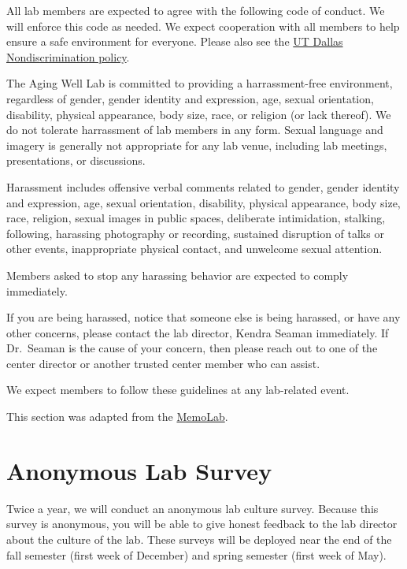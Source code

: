 \documentclass[]{book}
\begin{document}
All lab members are expected to agree with the following code of conduct. We will enforce this code as needed. We expect cooperation with all members to help ensure a safe environment for everyone. Please also see the \href{https://policy.utdallas.edu/utdbp3090}{UT Dallas Nondiscrimination policy}.

The Aging Well Lab is committed to providing a harrassment-free environment, regardless of gender, gender identity and expression, age, sexual orientation, disability, physical appearance, body size, race, or religion (or lack thereof). We do not tolerate harrassment of lab members in any form. Sexual language and imagery is generally not appropriate for any lab venue, including lab meetings, presentations, or discussions.

Harassment includes offensive verbal comments related to gender, gender identity and expression, age, sexual orientation, disability, physical appearance, body size, race, religion, sexual images in public spaces, deliberate intimidation, stalking, following, harassing photography or recording, sustained disruption of talks or other events, inappropriate physical contact, and unwelcome sexual attention.

Members asked to stop any harassing behavior are expected to comply immediately.

If you are being harassed, notice that someone else is being harassed, or have any other concerns, please contact the lab director, Kendra Seaman immediately. If Dr.~Seaman is the cause of your concern, then please reach out to one of the center director or another trusted center member who can assist.

We expect members to follow these guidelines at any lab-related event.

This section was adapted from the \href{https://github.com/memobc/memolab-manual\#code-of-conduct}{MemoLab}.

\hypertarget{anonymous-lab-survey}{%
\section{Anonymous Lab Survey}\label{anonymous-lab-survey}}

Twice a year, we will conduct an anonymous lab culture survey. Because this survey is anonymous, you will be able to give honest feedback to the lab director about the culture of the lab. These surveys will be deployed near the end of the fall semester (first week of December) and spring semester (first week of May).
\end{document}
